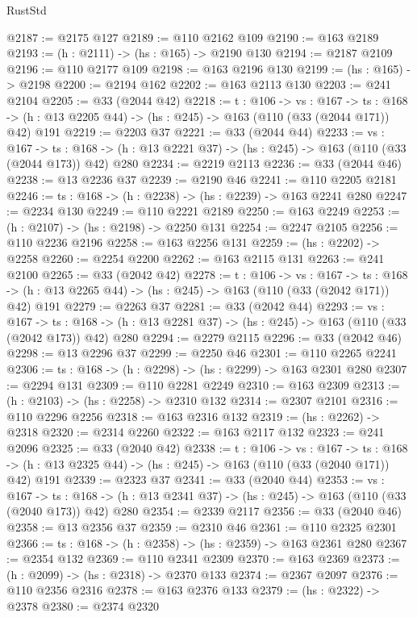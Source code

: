 \begin{lexlean}{RustStd}
\begin{coremodule}
{\begin{coremodule}
{{{{{@2187 := @2175 @127
@2189 := @110 @2162 @109
@2190 := @163 @2189
@2193 := (h : @2111) -> (hs : @165) -> @2190 @130
@2194 := @2187 @2109
@2196 := @110 @2177 @109
@2198 := @163 @2196 @130
@2199 := (hs : @165) -> @2198
@2200 := @2194 @162
@2202 := @163 @2113 @130
@2203 := @241 @2104
@2205 := @33 (@2044 @42)
@2218 := {t : @106} ->
  {vs : @167} ->
  {ts : @168} -> (h : @13 @2205 @44) -> (hs : @245) -> @163 (@110 (@33 (@2044 @171)) @42) @191
@2219 := @2203 @37
@2221 := @33 (@2044 @44)
@2233 := {vs : @167} ->
  {ts : @168} -> (h : @13 @2221 @37) -> (hs : @245) -> @163 (@110 (@33 (@2044 @173)) @42) @280
@2234 := @2219 @2113
@2236 := @33 (@2044 @46)
@2238 := @13 @2236 @37
@2239 := @2190 @46
@2241 := @110 @2205 @2181
@2246 := {ts : @168} -> (h : @2238) -> (hs : @2239) -> @163 @2241 @280
@2247 := @2234 @130
@2249 := @110 @2221 @2189
@2250 := @163 @2249
@2253 := (h : @2107) -> (hs : @2198) -> @2250 @131
@2254 := @2247 @2105
@2256 := @110 @2236 @2196
@2258 := @163 @2256 @131
@2259 := (hs : @2202) -> @2258
@2260 := @2254 @2200
@2262 := @163 @2115 @131
@2263 := @241 @2100
@2265 := @33 (@2042 @42)
@2278 := {t : @106} ->
  {vs : @167} ->
  {ts : @168} -> (h : @13 @2265 @44) -> (hs : @245) -> @163 (@110 (@33 (@2042 @171)) @42) @191
@2279 := @2263 @37
@2281 := @33 (@2042 @44)
@2293 := {vs : @167} ->
  {ts : @168} -> (h : @13 @2281 @37) -> (hs : @245) -> @163 (@110 (@33 (@2042 @173)) @42) @280
@2294 := @2279 @2115
@2296 := @33 (@2042 @46)
@2298 := @13 @2296 @37
@2299 := @2250 @46
@2301 := @110 @2265 @2241
@2306 := {ts : @168} -> (h : @2298) -> (hs : @2299) -> @163 @2301 @280
@2307 := @2294 @131
@2309 := @110 @2281 @2249
@2310 := @163 @2309
@2313 := (h : @2103) -> (hs : @2258) -> @2310 @132
@2314 := @2307 @2101
@2316 := @110 @2296 @2256
@2318 := @163 @2316 @132
@2319 := (hs : @2262) -> @2318
@2320 := @2314 @2260
@2322 := @163 @2117 @132
@2323 := @241 @2096
@2325 := @33 (@2040 @42)
@2338 := {t : @106} ->
  {vs : @167} ->
  {ts : @168} -> (h : @13 @2325 @44) -> (hs : @245) -> @163 (@110 (@33 (@2040 @171)) @42) @191
@2339 := @2323 @37
@2341 := @33 (@2040 @44)
@2353 := {vs : @167} ->
  {ts : @168} -> (h : @13 @2341 @37) -> (hs : @245) -> @163 (@110 (@33 (@2040 @173)) @42) @280
@2354 := @2339 @2117
@2356 := @33 (@2040 @46)
@2358 := @13 @2356 @37
@2359 := @2310 @46
@2361 := @110 @2325 @2301
@2366 := {ts : @168} -> (h : @2358) -> (hs : @2359) -> @163 @2361 @280
@2367 := @2354 @132
@2369 := @110 @2341 @2309
@2370 := @163 @2369
@2373 := (h : @2099) -> (hs : @2318) -> @2370 @133
@2374 := @2367 @2097
@2376 := @110 @2356 @2316
@2378 := @163 @2376 @133
@2379 := (hs : @2322) -> @2378
@2380 := @2374 @2320
}}}}}
\end{coremodule}}
\end{coremodule}
\end{lexlean}
